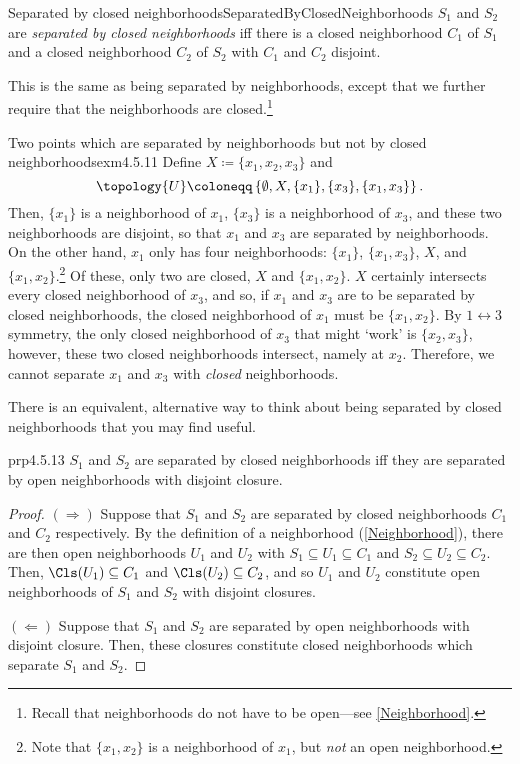 \begin{dfn}{Separated by closed neighborhoods}{SeparatedByClosedNeighborhoods}
$S_1$ and $S_2$ are \emph{separated by closed neighborhoods} iff there is a closed neighborhood $C_1$ of $S_1$ and a closed neighborhood $C_2$ of $S_2$ with $C_1$ and $C_2$ disjoint.
\begin{rmk}
This is the same as being separated by neighborhoods, except that we further require that the neighborhoods are closed.\footnote{Recall that neighborhoods do not have to be open---see \cref{Neighborhood}.}
\end{rmk}
\end{dfn}
\begin{exm}{Two points which are separated by neighborhoods but not by closed neighborhoods}{exm4.5.11}
Define $X\coloneqq \{ x_1,x_2,x_3\}$ and
\begin{equation}
\topology{U}\coloneqq \left\{ \emptyset ,X,\{ x_1\} ,\{ x_3\} ,\{ x_1,x_3\} \right\} .
\end{equation}
Then, $\{ x_1\}$ is a neighborhood of $x_1$, $\{ x_3\}$ is a neighborhood of $x_3$, and these two neighborhoods are disjoint, so that $x_1$ and $x_3$ are separated by neighborhoods.  On the other hand, $x_1$ only has four neighborhoods:  $\{ x_1\}$, $\{ x_1,x_3\}$, $X$, and $\{ x_1,x_2\}$.\footnote{Note that $\{ x_1,x_2\}$ is a neighborhood of $x_1$, but \emph{not} an open neighborhood.}  Of these, only two are closed, $X$ and $\{ x_1,x_2\}$.  $X$ certainly intersects every closed neighborhood of $x_3$, and so, if $x_1$ and $x_3$ are to be separated by closed neighborhoods, the closed neighborhood of $x_1$ must be $\{ x_1,x_2\}$.  By $1\leftrightarrow 3$ symmetry, the only closed neighborhood of $x_3$ that might `work' is $\{ x_2,x_3\}$, however, these two closed neighborhoods intersect, namely at $x_2$.  Therefore, we cannot separate $x_1$ and $x_3$ with \emph{closed} neighborhoods.
\end{exm}
There is an equivalent, alternative way to think about being separated by closed neighborhoods that you may find useful.
\begin{prp}{}{prp4.5.13}
$S_1$ and $S_2$ are separated by closed neighborhoods iff they are separated by open neighborhoods with disjoint closure.
\begin{proof}
$(\Rightarrow )$ Suppose that $S_1$ and $S_2$ are separated by closed neighborhoods $C_1$ and $C_2$ respectively.  By the definition of a neighborhood (\cref{Neighborhood}), there are then open neighborhoods $U_1$ and $U_2$ with $S_1\subseteq U_1\subseteq C_1$ and $S_2\subseteq U_2\subseteq C_2$.  Then, $\Cls (U_1)\subseteq C_1$ and $\Cls (U_2)\subseteq C_2$, and so $U_1$ and $U_2$ constitute open neighborhoods of $S_1$ and $S_2$ with disjoint closures.

\blankline
\noindent
$(\Leftarrow )$ Suppose that $S_1$ and $S_2$ are separated by open neighborhoods with disjoint closure.  Then, these closures constitute closed neighborhoods which separate $S_1$ and $S_2$.
\end{proof}
\end{prp}

